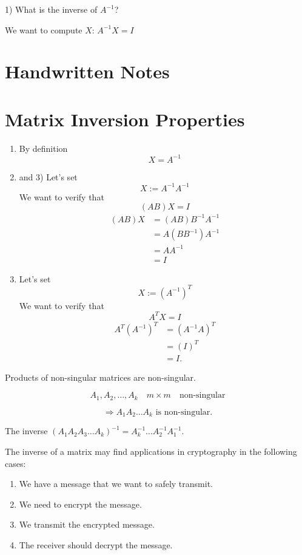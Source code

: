 1) What is the inverse of $A^{-1}$?

We want to compute $X$: $A^{-1}X = I$
\section{Handwritten Notes}





\section*{Matrix Inversion Properties}

\begin{enumerate}
    \item By definition
    \[ X = A^{-1} \]
    
    \item and 3) Let's set
    \[ X := A^{-1}A^{-1} \]
    We want to verify that
    \[ (AB)X = I \]
    \begin{align*}
        (AB)X &= (AB)B^{-1}A^{-1} \\
        &= A(BB^{-1})A^{-1} \\
        &= AA^{-1} \\
        &= I
    \end{align*}
    
    \item Let's set
    \[ X := (A^{-1})^T \]
    We want to verify that
    \[ A^TX = I \]
    \begin{align*}
        A^T(A^{-1})^T &= (A^{-1}A)^T \\
        &= (I)^T \\
        &= I.
    \end{align*}
\end{enumerate}

Products of non-singular matrices are non-singular.

\[ A_1, A_2, \ldots, A_k \quad m \times m \quad \text{non-singular} \]

\[\Rightarrow A_1A_2 \ldots A_k \text{ is non-singular.} \]



The inverse $(A_1 A_2 A_3 \ldots A_k)^{-1} = A_k^{-1} \ldots A_2^{-1} A_1^{-1}$.

The inverse of a matrix may find applications in cryptography in the following cases:

\begin{enumerate}
    \item We have a message that we want to safely transmit.
    \item We need to encrypt the message.
    \item We transmit the encrypted message.
    \item The receiver should decrypt the message.
\end{enumerate}

